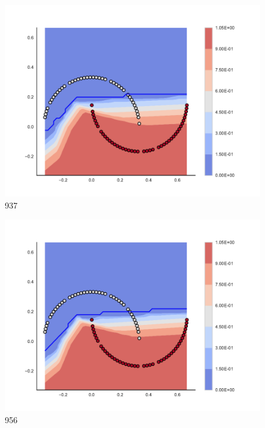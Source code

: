 \begin{subfigure}[b]{0.09\textwidth}
    \includegraphics[clip, trim=2.35cm 1.75cm 4.5cm 0cm,width=\textwidth]{img/convergence/937.pdf}
    \caption{937}
    \label{fig:convergence_937}
\end{subfigure}
%
\begin{subfigure}[b]{0.09\textwidth}
    \includegraphics[clip, trim=2.35cm 1.75cm 4.5cm 0cm,width=\textwidth]{img/convergence/956.pdf}
    \caption{956}
    \label{fig:convergence_956}
\end{subfigure}
%
